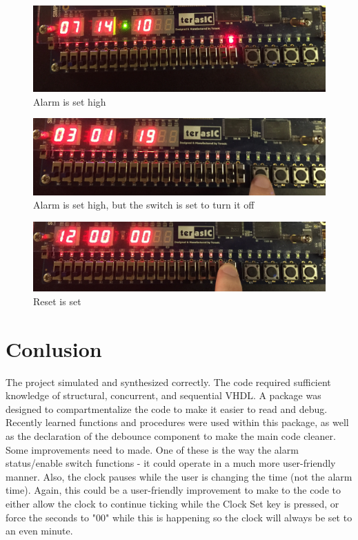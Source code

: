 \documentclass[12pt]{article}
\begin{document}
\begin{figure}[H]
\begin{center}
\includegraphics[scale=0.1]{board_3.png}
\caption{Alarm is set high}
\label{fig:board3}
\end{center}
\end{figure}

\begin{figure}[H]
\begin{center}
\includegraphics[scale=0.1]{board_4.png}
\caption{Alarm is set high, but the switch is set to turn it off}
\label{fig:board4}
\end{center}
\end{figure}

\begin{figure}[H]
\begin{center}
\includegraphics[scale=0.1]{board_5.png}
\caption{Reset is set}
\label{fig:board5}
\end{center}
\end{figure}

\newpage

\section{Conlusion} \label{cncl}
The project simulated and synthesized correctly.  The code required sufficient knowledge of structural, concurrent, and sequential VHDL. A package was designed to compartmentalize the code to make it easier to read and debug.  Recently learned functions and procedures were used within this package, as well as the declaration of the debounce component to make the main code cleaner.  Some improvements need to made.  One of these is the way the alarm status/enable switch functions - it could operate in a much more user-friendly manner.  Also, the clock pauses while the user is changing the time (not the alarm time).  Again, this could be a user-friendly improvement to make to the code to either allow the clock to continue ticking while the Clock Set key is pressed, or force the seconds to "00" while this is happening so the clock will always be set to an even minute.
\end{document}
